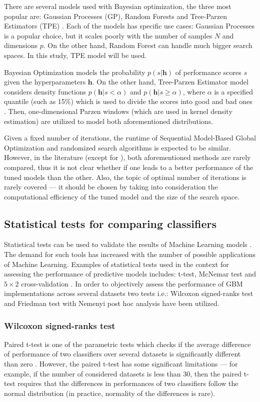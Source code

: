 \documentclass[magisterska, english]{pwr_wmat_praca_dyplomowa}
\theoremstyle{plain}
\numberwithin{theorem}{chapter}
\theoremstyle{definition}
\numberwithin{theorem}{chapter}
\begin{document}
There are several models used with Bayesian optimization, the three most popular are: Gaussian Processes (GP), Random Forests and Tree-Parzen Estimators (TPE) \cite{hyperboost}. Each of the models has specific use cases: Gaussian Processes is a popular choice, but it scales poorly with the number of samples $N$ and dimensions $p$. On the other hand, Random Forest can handle much bigger search spaces. In this study, TPE model will be used.

Bayesian Optimization models the probability
$p(s|\mathbf{h})$ of performance scores $s$ given the hyperparameters $\mathbf{h}$. On the other hand, Tree-Parzen Estimator model considers density
functions $p(\mathbf{h}|s < \alpha)$ and $p(\mathbf{h}|s\ge\alpha)$, where $\alpha$ is a specified quantile (such as 15\%) which is used to divide the scores into good and bad ones \cite{hyperboost}. Then, one-dimensional Parzen windows (which are used in kernel density estimation) are utilized to model both aforementioned distributions.

Given a fixed number of iterations, the runtime of Sequential Model-Based Global Optimization \cite{tpe} and randomized search \cite{randomized} algorithms is expected to be similar. However, in the literature (except for \cite{tpe}), both aforementioned methods are rarely compared, thus it is not clear whether if one leads to a better performance of the tuned models than the other. Also, the topic of optimal number of iterations is rarely covered --- it should be chosen by taking into consideration the computational efficiency of the tuned model and the size of the search space.

\subsection{Statistical tests for comparing classifiers}
Statistical tests can be used to validate the results of Machine Learning models \cite{demsar}. The demand for such tools has increased with the number of possible applications of Machine Learning. Examples of statistical tests used in the context for assessing the performance of predictive models includes: t-test, McNemar test and $5\times2$ cross-validation \cite{demsar}.
In order to objectively assess the performance of GBM implementations across several datasets two tests i.e.: Wilcoxon signed-ranks test and Friedman test with Nemenyi post hoc analysis have been utilized.

\subsubsection{Wilcoxon signed-ranks test}
Paired t-test is one of the parametric tests which checks if the average difference of performance of two classifiers over several datasets is significantly different than zero \cite{demsar}. However, the paired t-test has some significant limitations --- for example, if the number of considered datasets is less than 30, then the paired t-test requires that the differences in performances of two classifiers follow the normal distribution (in practice, normality of the differences is rare).
\end{document}
